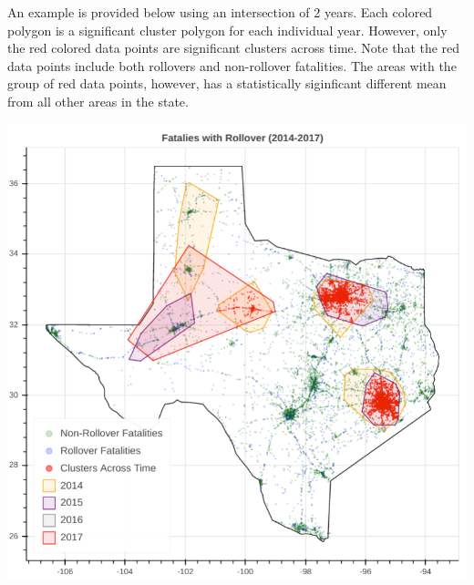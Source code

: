 \documentclass{article}
\begin{document}
An example is provided below using an intersection of 2 years. Each colored polygon is a significant cluster polygon for each individual year. However, only the red colored data points are significant clusters across time. Note that the red data points include both rollovers and non-rollover fatalities. The areas with the group of red data points, however, has a statistically siginficant different mean from all other areas in the state.
\begin{center}
\includegraphics[scale=0.4]{technical.png}
\end{center}
\end{document}
